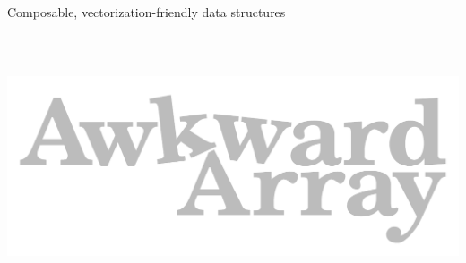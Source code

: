 \documentclass[aspectratio=169]{beamer}
\begin{document}
\begin{frame}{Composable, vectorization-friendly data structures}
\vspace{-0.25 cm}
\begin{columns}
\end{columns}
\end{frame}

\begin{frame}{\mbox{ }}
\vspace{0.5 cm}
\begin{center}
\includegraphics[width=0.5\linewidth]{awkward-logo.pdf}
\end{center}
\end{frame}
\end{document}
